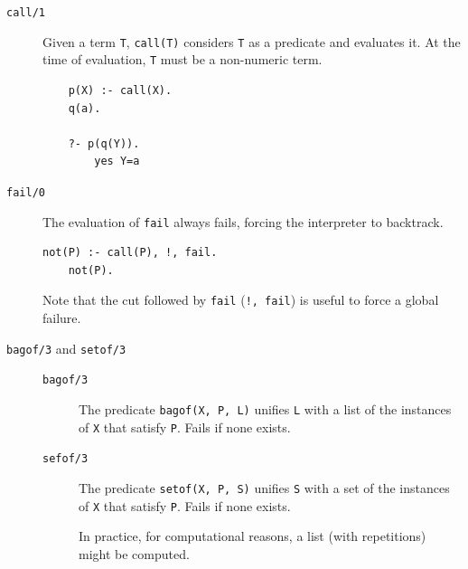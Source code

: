 \begin{description}
    \item[\texttt{call/1}] 
        Given a term \texttt{T}, \texttt{call(T)} considers \texttt{T} as a predicate and evaluates it.
        At the time of evaluation, \texttt{T} must be a non-numeric term.

        \begin{example} \phantom{}
            \begin{lstlisting}
    p(X) :- call(X).
    q(a).

    ?- p(q(Y)).
        yes Y=a
            \end{lstlisting}
        \end{example}

    \item[\texttt{fail/0}] 
        The evaluation of \texttt{fail} always fails, forcing the interpreter to backtrack.

        \begin{example} \phantom{}
            \begin{lstlisting}[language={}]
    not(P) :- call(P), !, fail.
    not(P).
            \end{lstlisting}
        \end{example} 
        \vspace*{-1.5em}
        Note that the cut followed by \texttt{fail} (\texttt{!, fail}) is useful to force a global failure.

    \item[\texttt{bagof/3} and \texttt{setof/3}] \phantom{}
        \begin{description}
            \item[\texttt{bagof/3}]  
                The predicate \texttt{bagof(X, P, L)} unifies \texttt{L} with a list of the instances of \texttt{X} that satisfy \texttt{P}.
                Fails if none exists.
            \item[\texttt{sefof/3}]  
                The predicate \texttt{setof(X, P, S)} unifies \texttt{S} with a set of the instances of \texttt{X} that satisfy \texttt{P}.
                Fails if none exists.
                
                In practice, for computational reasons, a list (with repetitions) might be computed.
        \end{description}
        

\end{description}
